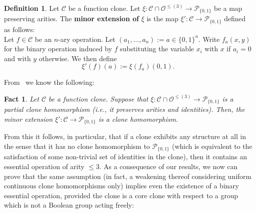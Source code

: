 \documentclass{article}
\newtheorem{fact}[theorem]{Fact}
\theoremstyle{remark}
\theoremstyle{definition}
\newtheorem{definition}[theorem]{Definition}
\begin{document}
\begin{definition} Let $\mathcal{C}$ be a function clone. Let $\xi:\mathcal{C}\cap \mathcal{O}^{\leq (3)}\to \mathcal{P}_{\{0,1\}}$ be a map preserving arities. The \textbf{minor extension of} $\xi$ is the map $\xi':\mathcal{C}\to \mathcal{P}_{\{0,1\}}$ defined as follows:\\

Let $f\in\mathcal{C}$ be an $n$-ary operation. Let $(a_1, \dots, a_n):=a\in\{0,1\}^n$. Write $f_a(x,y)$ for the binary operation induced by $f$ substituting the variable $x_i$ with $x$ if $a_i=0$ and with $y$ otherwise. We then define 
\[\xi'(f)(a):=\xi(f_a)(0,1).\]
\end{definition}

From~\cite[Proposition 6.8]{irrelevant} we know the following: 
\begin{fact}\label{ternarytheom} Let $\mathcal{C}$ be a  function clone. Suppose that $\xi:\mathcal{C}\cap \mathcal{O}^{\leq(3)}\to \mathcal{P}_{\{0,1\}}$ is a partial clone homomorphism (i.e., it preserves arities and identities). Then, the minor extension $\xi':\mathcal{C}\to \mathcal{P}_{\{0,1\}}$ is a clone homomorphism.
\end{fact}

From this it follows, in particular, that  if a clone exhibits  any structure at all in the sense that it has no clone homomorphism to $\mathcal{P}_{\{0,1\}}$ (which is equivalent to the satisfaction of some non-trivial set of identities in the clone), then it contains an essential operation of arity $\leq 3$. As a consequence of our results, we now can prove that  the same assumption (in fact, a weakening thereof considering uniform continuous clone homomorphisms only) implies even the existence of a binary essential operation, provided the clone is a core clone with respect to a group which is not a Boolean group acting freely:
\end{document}
